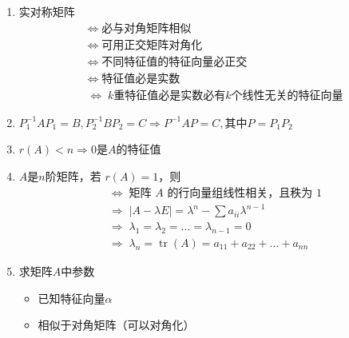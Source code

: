 \documentclass[./linear_algebra.tex]{subfiles}
\begin{document}
    \begin{enumerate}
        \item 实对称矩阵
        \begin{align*}
            &\Leftrightarrow\; \text{必与对角矩阵相似}  \\
            &\Leftrightarrow\; \text{可用正交矩阵对角化}  \\
            &\Leftrightarrow\; \text{不同特征值的特征向量必正交}  \\
            &\Leftrightarrow\; \text{特征值必是实数}  \\
            &\Leftrightarrow\; k\text{重特征值必是实数必有}k\text{个线性无关的特征向量}
        \end{align*}
        \item $P_1^{-1}AP_1 = B, P_2^{-1}BP_2 = C \Rightarrow P^{-1}AP = C, \text{其中}P = P_{1}P_2$
        \item $r(A) < n \Rightarrow 0 \text{是} A \text{的特征值}$
        \item $A$是$n$阶矩阵，若 $r(A) = 1$，则
        \begin{align*}
            &\Leftrightarrow\; \text{矩阵 $A$ 的行向量组线性相关，且秩为 1}  \\
            &\Rightarrow\; |A - \lambda E| = \lambda^n - \sum a_{ii}\lambda^{n-1}  \\
            &\Rightarrow\; \lambda_1 = \lambda_2 = \dots = \lambda_{n-1} = 0  \\
            &\Rightarrow\; \lambda_n = \operatorname{tr}(A) = a_{11} + a_{22} + \dots + a_{nn}
        \end{align*}
        \item 求矩阵$A$中参数
        \begin{itemize}
            \item 已知特征向量$\alpha$
            \item 相似于对角矩阵（可以对角化）
\end{itemize}
\end{enumerate}
\end{document}

